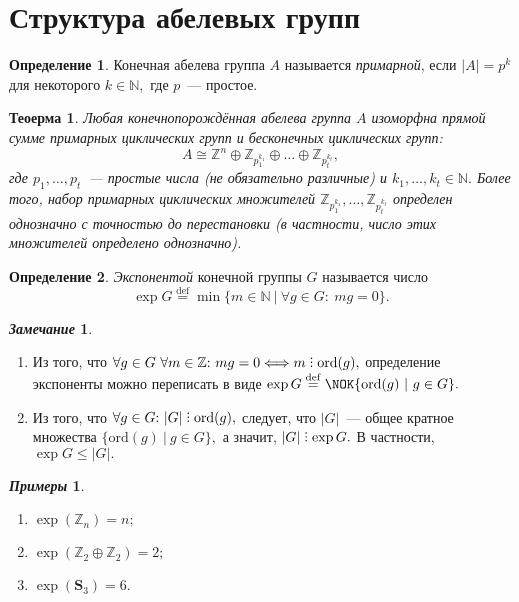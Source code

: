 \documentclass[a4paper, 14pt]{extarticle}
\newcommand{\deq}{\stackrel{\mathrm{def}}{=}}
\newcommand{\integers}{\mathbb{Z}}
\newcommand{\naturals}{\mathbb{N}}
\newcommand{\symmetrical}{\mathbf{S}}
\newcommand{\ord}{\mathrm{ord}}
\newcommand{\suchthat}{{:}{ } \ }
\DeclareRobustCommand{\divby}{%
	\mathrel{\text{\vbox{\baselineskip.65ex\lineskiplimit0pt\hbox{.}\hbox{.}\hbox{.}}}}%
}
\theoremstyle{definition}
\newtheorem*{exmpls}{\textit{Примеры}}
\newtheorem*{remark}{\textit{Замечание}}
\newtheorem{definition}{Определение}
\theoremstyle{plain}
\newtheorem{theorem}{Теоерма}
\numberwithin{theorem}{section}
\numberwithin{definition}{section}
\numberwithin{statement}{section}
\numberwithin{lemma}{section}
\numberwithin{consequence}{section}
\begin{document}
        \section{Структура абелевых групп}
        \setcounter{definition}{0}
	\begin{definition}
		Конечная абелева группа $A$ называется \textit{примарной}, если ${|A| = p^k}$ для некоторого ${k \in \naturals,}$ где $p$~--- простое.
	\end{definition}
	\begin{theorem}
        Любая конечнопорождённая абелева группа $A$
        изоморфна прямой сумме примарных циклических групп и бесконечных циклических групп: 
        \begin{equation*}
            A \cong \integers^n \oplus \integers_{p^{k_1}_1} \oplus \ldots \oplus \integers_{p^{k_t}_t},
        \end{equation*}
        где ${p_1, \ldots, p_t}$~--- простые числа (не обязательно различные) и ${k_1, \ldots, k_t \in \naturals.}$ Более того, набор примарных циклических множителей ${\integers_{p^{k_1}_1}, \ldots, \integers_{p^{k_t}_t}}$ определен однозначно с точностью до перестановки (в частности, число этих множителей определено однозначно).
	\end{theorem}
	\begin{definition}
		\textit{Экспонентой} конечной группы $G$ называется число
		\begin{equation*}
			\exp G \deq \min \{m \in \naturals \ | \ \forall g \in G\suchthat mg = 0\}.
		\end{equation*}
	\end{definition}
	\begin{remark}
		\
		\begin{enumerate}
			\setlength\itemsep{0.1em}
			\item Из того, что ${\forall g \in G \  \forall m \in \integers\suchthat mg = 0 \Longleftrightarrow m \divby \ord(g),}$ определение экспоненты можно переписать в виде ${\exp G \deq \NOK \{\ord(g) \ | \ g \in G\}.}$
			\item Из того, что ${\forall g \in G\suchthat |G| \divby \ord(g),}$ следует, что $|G|$~--- общее кратное
			множества ${\{\ord(g) \ | \ g \in G\},}$ а значит, ${|G| \divby \exp G.}$ В частности,
			${\exp G \leqslant |G|.}$
		\end{enumerate}
	\end{remark}
        \begin{exmpls}
            \
            \begin{enumerate}
            \setlength\itemsep{0.1em}
                \item $\exp(\integers_n) = n;$
                \item $\exp(\integers_2 \oplus \integers_2) = 2;$
                \item $\exp(\symmetrical_3) = 6.$
            \end{enumerate}
        \end{exmpls}
\end{document}
